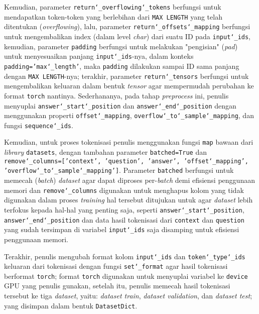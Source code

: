 Kemudian, parameter \texttt{return\char`_overflowing\char`_tokens} berfungsi untuk mendapatkan token-token yang berlebihan dari \texttt{MAX LENGTH} yang telah ditentukan (\emph{overflowing}), lalu, parameter \texttt{return\char`_offsets\char`_mapping} berfungsi untuk mengembalikan index (dalam level \emph{char}) dari suatu ID pada \texttt{input\char`_ids}, kemudian, parameter \texttt{padding} berfungsi untuk melakukan "pengisian" (\emph{pad}) untuk menyesuaikan panjang \texttt{input\char`_ids}-nya, dalam konteks \texttt{padding='max\char`_length'}, maka \texttt{padding} dilakukan sampai ID sama panjang dengan \texttt{MAX LENGTH}-nya; terakhir, parameter \texttt{return\char`_tensors} berfungsi untuk mengembalikan keluaran dalam bentuk \emph{tensor} agar mempermudah perubahan ke format \texttt{torch} nantinya. Sederhananya, pada tahap \emph{preprocess} ini, penulis menyuplai \texttt{answer\char`_start\char`_position} dan \texttt{answer\char`_end\char`_position} dengan menggunakan properti \texttt{offset\char`_mapping}, \texttt{overflow\char`_to\char`_sample\char`_mapping}, dan fungsi \texttt{sequence\char`_ids}.

Kemudian, untuk proses tokenisasi penulis menggunakan fungsi \texttt{map} bawaan dari \emph{library} \texttt{datasets}, dengan tambahan parameter \texttt{batched=True} dan \texttt{remove\char`_columns=['context', 'question', 'answer', 'offset\char`_mapping', 'overflow\char`_to\char`_sample\char`_mapping']}. Parameter \texttt{batched} berfungsi untuk memecah (\emph{batch}) \emph{dataset} agar dapat diproses per-\emph{batch} demi efisiensi penggunaan memori dan \texttt{remove\char`_columns} digunakan untuk menghapus kolom yang tidak digunakan dalam proses \emph{training} hal tersebut ditujukan untuk agar \emph{dataset} lebih terfokus kepada hal-hal yang penting saja, seperti \texttt{answer\char`_start\char`_position}, \texttt{answer\char`_end\char`_position} dan data hasil tokenisasi dari \texttt{context} dan   \texttt{question} yang sudah tersimpan di variabel \texttt{input\char`_ids} saja disamping untuk efisiensi penggunaan memori.

Terakhir, penulis mengubah format kolom \texttt{input\char`_ids} dan \texttt{token\char`_type\char`_ids} keluaran dari tokenisasi dengan fungsi \texttt{set\char`_format} agar hasil tokenisasi berformat \texttt{torch}; format \texttt{torch} digunakan untuk menyuplai variabel ke \texttt{device} GPU yang penulis gunakan, setelah itu, penulis memecah hasil tokenisasi tersebut ke tiga \emph{dataset}, yaitu: \emph{dataset train}, \emph{dataset validation}, dan \emph{dataset test}; yang disimpan dalam bentuk \texttt{DatasetDict}.

